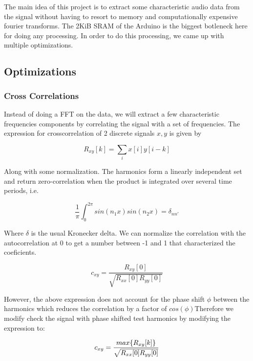 
The main idea of this project is to extract some characteristic audio data from
the signal without having to resort to memory and computationally expensive
fourier transforms. The 2KiB SRAM of the Arduino is the biggest botleneck here
for doing any processing. In order to do this processing, we came up with
multiple optimizations. 

\subsection{Optimizations}

\subsubsection{Cross Correlations} 
Instead of doing a FFT on the data, we will extract a few characteristic
frequencies components by correlating the signal with a set of frequencies. The
expression for crosscorrelation of 2 discrete signals \(x,y\) is given by

\begin{equation}
    R_{xy}[k] = \sum_{i} x[i]y[i-k]
\end{equation}

Along with some normalization. The harmonics form a linearly independent set and
return zero-correlation when the product is integrated over several time periods,
i.e.

\begin{equation}
    \frac{1}{\pi} \int_0^{2\pi}sin(n_1x)sin(n_2x) = \delta_{nn'}  
\end{equation} 

Where \(\delta\) is the usual Kronecker delta. We can normalize the correlation
with the autocorrelation at 0 to get a number between -1 and 1 that
characterized the coeficients.

\begin{equation}
    c_{xy} = \frac{R_{xy}[0]}{\sqrt{R_{xx}[0]R_{yy}[0]} }
\end{equation} 

However, the above expression does not account for the phase shift \(\phi\)
between the harmonics which reduces the correlation by a factor of
\(cos(\phi)\)Therefore we modify check the signal with phase shifted test
harmonics by modifying the expression to:

\begin{equation}
    c_{xy} = \frac{\mathnormal{max}\{R_{xy}[k]\}}{\sqrt{R_{xx}[0]R_{yy}[0]} }
\end{equation}

